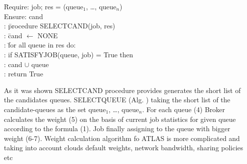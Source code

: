 \begin{tabbing}
\hspace{0.5in}\=
     Require: job; res = (queue$_1$, \ldots, queue$_n$) \\
  \> Ensure: cand \\
  : \hspace{1em}\= procedure SELECT{\textunderscore}CAND(job, res) \\
  :             \> \hspace{1em}\= cand $\leftarrow$ NONE \\
  :             \> \hspace{1em}\= for all queue in res do: \\
  :             \>             \> if SATISFY{\textunderscore}JOB(queue, %
job) = True then \\
  :             \>             \> \hspace{1em} cand $\cup$ queue \\
  :             \>             \> return True
\end{tabbing}

As it was shown SELECT{\textunderscore}CAND procedure provides generates the
short list of the candidates queues. SELECT{\textunderscore}QUEUE (Alg. )
taking the short list of the candidate-queues as the set queue$_1$, \ldots,
queue$_n$. For each queue (4) Broker calculates the weight (5) on the basis of
current job statistics for given queue according to the formula (1). Job
finally assigning to the queue with bigger weight (6-7). Weight calculation
algorithm fo ATLAS is more complicated and taking into account clouds default
weights, network bandwidth, sharing policies etc

